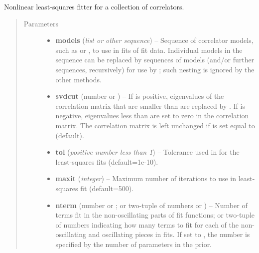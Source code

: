 \documentclass[letterpaper,10pt,english]{sphinxmanual}
\begin{document}
\begin{fulllineitems}
\label{corrfitter:corrfitter.CorrFitter}
Nonlinear least-squares fitter for a collection of correlators.
\begin{quote}\begin{description}
\item[{Parameters}] \leavevmode\begin{itemize}
\item {} 
\textbf{models} (\emph{list or other sequence}) -- Sequence of correlator models, such as 
{\hyperref[corrfitter:corrfitter.Corr2]{}} or {\hyperref[corrfitter:corrfitter.Corr3]{}}, 
to use in fits of fit data. Individual
models in the sequence can be replaced by sequences of models
(and/or further sequences, recursively) for use by
{\hyperref[corrfitter:corrfitter.CorrFitter.chained_lsqfit]{}}; such nesting
is ignored by the other methods.

\item {} 
\textbf{svdcut} (number or ) -- If  is positive, eigenvalues  of the 
correlation matrix that are smaller than
 are replaced by . 
If  is negative, eigenvalues less than
 are set to zero in the correlation matrix. The
correlation matrix is left unchanged if  is set equal to
 (default).

\item {} 
\textbf{tol} (\emph{positive number less than 1}) -- Tolerance used in  for the 
least-squares fits (default=1e-10).

\item {} 
\textbf{maxit} (\emph{integer}) -- Maximum number of iterations to use in least-squares fit 
(default=500).

\item {} 
\textbf{nterm} (number or ; or two-tuple of numbers or ) -- Number of terms fit in the non-oscillating parts of fit 
functions; or two-tuple of numbers indicating how many terms to fit
for each of the non-oscillating and oscillating pieces in fits. If set
to , the number is specified by the number of parameters in
the prior.


\end{itemize}
\end{description}
\end{quote}
\end{fulllineitems}
\end{document}
